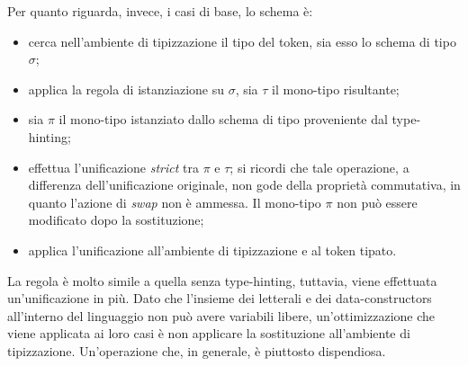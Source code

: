 \documentclass[10pt,a4paper]{article}
\begin{document}
Per quanto riguarda, invece, i casi di base, lo schema è:
\begin{itemize}
    \item cerca nell'ambiente di tipizzazione il tipo del token, sia esso lo schema di tipo $ \sigma $;
    \item applica la regola di istanziazione su $ \sigma $, sia $ \tau $ il mono-tipo risultante;
    \item sia $ \pi $ il mono-tipo istanziato dallo schema di tipo proveniente dal type-hinting;
    \item effettua l'unificazione \textit{strict} tra $ \pi $ e $ \tau $; si ricordi che tale operazione, a differenza
    dell'unificazione originale, non gode della proprietà commutativa, in quanto l'azione di \textit{swap} non è
    ammessa. Il mono-tipo $ \pi $ non può essere modificato dopo la sostituzione;
    \item applica l'unificazione all'ambiente di tipizzazione e al token tipato.
\end{itemize}
La regola è molto simile a quella senza type-hinting, tuttavia, viene effettuata un'unificazione in più.
Dato che l'insieme dei letterali e dei data-constructors all'interno del linguaggio non può avere variabili libere,
un'ottimizzazione che viene applicata ai loro casi è non applicare la sostituzione
all'ambiente di tipizzazione. Un'operazione che, in generale, è piuttosto dispendiosa.
\end{document}
